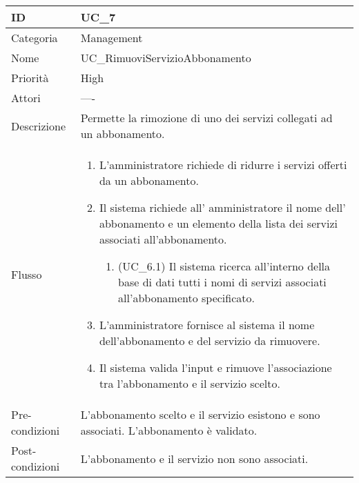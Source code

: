 \begin{center}
\begin{tabular}{ |p{2cm}|p{13cm}|  }
\hline
ID & UC\_7 \\\hline
Categoria & Management\\\hline
Nome & UC\_RimuoviServizioAbbonamento\\\hline
Priorità & High \\\hline
Attori &  ---- \\\hline
Descrizione & Permette la rimozione di uno dei servizi collegati ad un abbonamento.\\\hline
Flusso &  	\begin{enumerate}
			\item L'amministratore richiede di ridurre i servizi offerti da  un abbonamento.
			\item Il sistema richiede all' amministratore il nome dell' abbonamento e un elemento della lista dei servizi associati all'abbonamento.
			\begin{enumerate}
				\item (UC\_6.1) Il sistema ricerca all'interno della base di dati tutti i nomi di servizi associati all'abbonamento specificato.
			\end{enumerate}
			\item L'amministratore fornisce al sistema il nome dell'abbonamento e del servizio da rimuovere.
			\item Il sistema valida l'input e rimuove l'associazione tra l'abbonamento e il servizio scelto.
		\end{enumerate}\\\hline
Pre-condizioni &  L'abbonamento scelto e il servizio esistono e sono associati.\newline 
			L'abbonamento è validato.\\\hline
Post-condizioni &  L'abbonamento e il servizio non sono associati.\\\hline
\end{tabular}
\label{table_use_case:7}\newline


\end{center}
